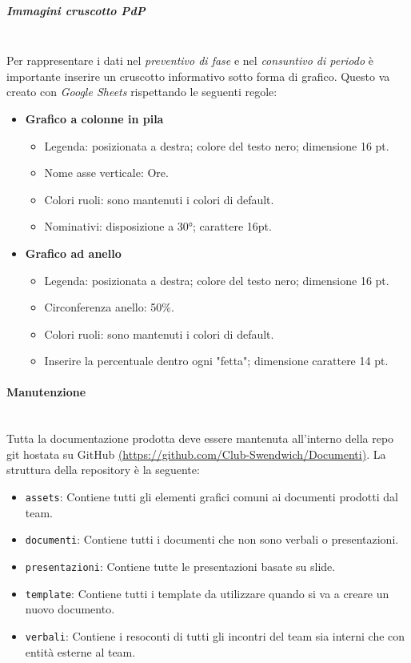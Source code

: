 \subparagraph{Immagini cruscotto PdP}
\mbox{}\\
Per rappresentare i dati nel \textit{preventivo di fase} e nel \textit{consuntivo di periodo}
è importante inserire un cruscotto informativo sotto forma di grafico. Questo va creato con 
\textit{Google Sheets} rispettando le seguenti regole:
\begin{itemize}
    \item \textbf{Grafico a colonne in pila}
    \begin{itemize}
        \item Legenda: posizionata a destra; colore del testo nero; dimensione 16 pt.
        \item Nome asse verticale: Ore.
        \item Colori ruoli: sono mantenuti i colori di default.
        \item Nominativi: disposizione a 30°; carattere 16pt. 
    \end{itemize}
    \item \textbf{Grafico ad anello}
    \begin{itemize}
        \item Legenda: posizionata a destra; colore del testo nero; dimensione 16 pt.
        \item Circonferenza anello: 50\%.
        \item Colori ruoli: sono mantenuti i colori di default.
        \item Inserire la percentuale dentro ogni "fetta"; dimensione carattere 14 pt.
    \end{itemize}
\end{itemize}

\paragraph{Manutenzione}
\mbox{}\\
Tutta la documentazione prodotta deve essere mantenuta all'interno della repo git hostata su GitHub \href{https://github.com/Club-Swendwich/Documenti}{(https://github.com/Club-Swendwich/Documenti)}.
La struttura della repository è la seguente:
\begin{itemize}
    \item \texttt{assets}: Contiene tutti gli elementi grafici comuni ai documenti
        prodotti dal team.
    \item \texttt{documenti}: Contiene tutti i documenti che non sono verbali o
        presentazioni.
    \item \texttt{presentazioni}: Contiene tutte le presentazioni basate su slide.
    \item \texttt{template}: Contiene tutti i template da utilizzare quando si va a
        creare un nuovo documento.
    \item \texttt{verbali}: Contiene i resoconti di tutti gli incontri del team sia
        interni che con entità esterne al team.
\end{itemize}

